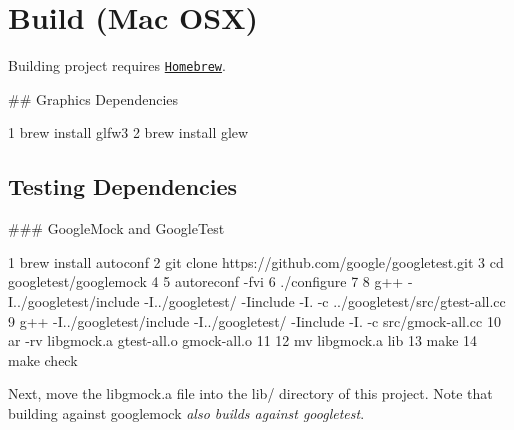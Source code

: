 \section*{Build (Mac O\+SX)}

Building project requires \href{http://brew.sh/}{\tt Homebrew}.

\#\# Graphics Dependencies 
\begin{DoxyCode}
1 brew install glfw3
2 brew install glew
\end{DoxyCode}


\subsection*{Testing Dependencies}

\#\#\# Google\+Mock and Google\+Test 
\begin{DoxyCode}
1 brew install autoconf
2 git clone https://github.com/google/googletest.git
3 cd googletest/googlemock
4 
5 autoreconf -fvi
6 ./configure
7 
8 g++ -I../googletest/include -I../googletest/ -Iinclude -I. -c ../googletest/src/gtest-all.cc 
9 g++ -I../googletest/include -I../googletest/ -Iinclude -I. -c src/gmock-all.cc 
10 ar -rv libgmock.a gtest-all.o gmock-all.o
11 
12 mv libgmock.a lib
13 make
14 make check
\end{DoxyCode}


Next, move the libgmock.\+a file into the lib/ directory of this project. Note that building against googlemock {\itshape also builds against googletest}. 